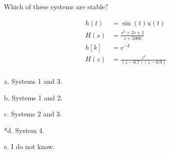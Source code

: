 
Which of these systems are stable? 

\begin{align}
 h\left( t \right) &= \sin(t)u(t)\  \\
 H\left( s \right) &= \frac{s^{2} + 2s + 1}{s + 5000}\  \\
 h\left\lbrack k \right\rbrack &= e^{- k}\  \\
 H\left( z \right) &= \frac{z^{4}}{\left( z - 0.7 \right)\left( z - 0.9 \right)}\  
\end{align} 
\\
a. Systems 1 and 3.

b. Systems 1 and 2.

c. Systems 2 and 3.

*d. System 4.

e. I do not know. \\
